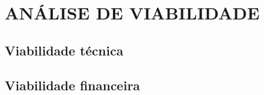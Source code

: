 %
%
%
%
%


\chapter{ANÁLISE DE VIABILIDADE}
\label{chap:an-via}


\section{Viabilidade técnica}
\label{sec:via-tec}


\section{Viabilidade financeira}
\label{sec:via-fin}







